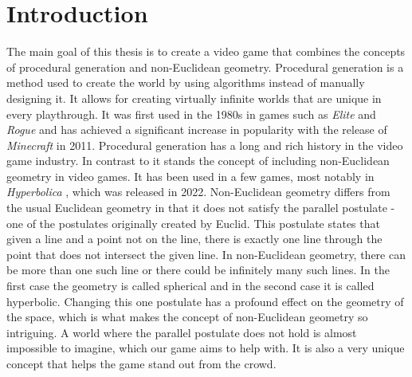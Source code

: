 \chapter{Introduction}\label{ch:introduction}


The main goal of this thesis is to create a video game that combines the concepts of procedural generation and non-Euclidean geometry.
Procedural generation is a method used to create the world by using algorithms instead of manually designing it.
It allows for creating virtually infinite worlds that are unique in every playthrough.
It was first used in the 1980s in games such as \textit{Elite} \cite{Elite1984} and \textit{Rogue} \cite{Rogue1980} and has achieved a significant increase in popularity with the release of \textit{Minecraft} \cite{Minecraft} in 2011.
Procedural generation has a long and rich history in the video game industry.
In contrast to it stands the concept of including non-Euclidean geometry in video games.
It has been used in a few games, most notably in \textit{Hyperbolica} \cite{Hyperbolica}, which was released in 2022.
Non-Euclidean geometry differs from the usual Euclidean geometry in that it does not satisfy the parallel postulate - one of the postulates originally created by Euclid.
This postulate states that given a line and a point not on the line, there is exactly one line through the point that does not intersect the given line.
In non-Euclidean geometry, there can be more than one such line or there could be infinitely many such lines.
In the first case the geometry is called spherical and in the second case it is called hyperbolic.
Changing this one postulate has a profound effect on the geometry of the space, which is what makes the concept of non-Euclidean geometry so intriguing.
A world where the parallel postulate does not hold is almost impossible to imagine, which our game aims to help with.
It is also a very unique concept that helps the game stand out from the crowd.

